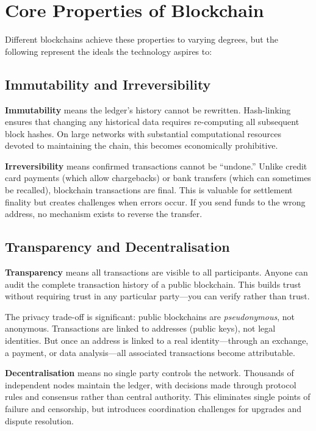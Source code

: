 \documentclass[11pt,a4paper]{article}
\newcommand{\keyword}[1]{\textbf{\textcolor{AccentOrange}{#1}}}
\begin{document}
\section{Core Properties of Blockchain}

Different blockchains achieve these properties to varying degrees, but the following represent the ideals the technology aspires to:

\subsection{Immutability and Irreversibility}

\keyword{Immutability} means the ledger's history cannot be rewritten. Hash-linking ensures that changing any historical data requires re-computing all subsequent block hashes. On large networks with substantial computational resources devoted to maintaining the chain, this becomes economically prohibitive.

\keyword{Irreversibility} means confirmed transactions cannot be ``undone.'' Unlike credit card payments (which allow chargebacks) or bank transfers (which can sometimes be recalled), blockchain transactions are final. This is valuable for settlement finality but creates challenges when errors occur. If you send funds to the wrong address, no mechanism exists to reverse the transfer.

\subsection{Transparency and Decentralisation}

\keyword{Transparency} means all transactions are visible to all participants. Anyone can audit the complete transaction history of a public blockchain. This builds trust without requiring trust in any particular party---you can verify rather than trust.

The privacy trade-off is significant: public blockchains are \textit{pseudonymous}, not anonymous. Transactions are linked to addresses (public keys), not legal identities. But once an address is linked to a real identity---through an exchange, a payment, or data analysis---all associated transactions become attributable.

\keyword{Decentralisation} means no single party controls the network. Thousands of independent nodes maintain the ledger, with decisions made through protocol rules and consensus rather than central authority. This eliminates single points of failure and censorship, but introduces coordination challenges for upgrades and dispute resolution.
\end{document}
